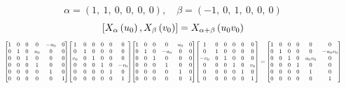 \documentclass[11pt]{article}
\theoremstyle{definition}
\begin{document}
\[
\alpha = \left( 1, \  1, \  0, \  0, \  0, \  0\right), \quad \beta = \left( -1, \  0, \  1, \  0, \  0, \  0\right)
\]
\[
\scaletoalign{\textwidth}{\left[ X_{\alpha}\left(u_{0}\right), X_{\beta}\left(v_{0}\right) \right] = X_{\alpha + \beta}\left(u_{0} v_{0}\right)}
\]
\[
\scaletoalign{\textwidth}{{\left[\begin{matrix}1 & 0 & 0 & 0 & - u_{0} & 0\\0 & 1 & 0 & u_{0} & 0 & 0\\0 & 0 & 1 & 0 & 0 & 0\\0 & 0 & 0 & 1 & 0 & 0\\0 & 0 & 0 & 0 & 1 & 0\\0 & 0 & 0 & 0 & 0 & 1\end{matrix}\right]} {\left[\begin{matrix}1 & 0 & 0 & 0 & 0 & 0\\0 & 1 & 0 & 0 & 0 & 0\\v_{0} & 0 & 1 & 0 & 0 & 0\\0 & 0 & 0 & 1 & 0 & - v_{0}\\0 & 0 & 0 & 0 & 1 & 0\\0 & 0 & 0 & 0 & 0 & 1\end{matrix}\right]} {\left[\begin{matrix}1 & 0 & 0 & 0 & u_{0} & 0\\0 & 1 & 0 & - u_{0} & 0 & 0\\0 & 0 & 1 & 0 & 0 & 0\\0 & 0 & 0 & 1 & 0 & 0\\0 & 0 & 0 & 0 & 1 & 0\\0 & 0 & 0 & 0 & 0 & 1\end{matrix}\right]} {\left[\begin{matrix}1 & 0 & 0 & 0 & 0 & 0\\0 & 1 & 0 & 0 & 0 & 0\\- v_{0} & 0 & 1 & 0 & 0 & 0\\0 & 0 & 0 & 1 & 0 & v_{0}\\0 & 0 & 0 & 0 & 1 & 0\\0 & 0 & 0 & 0 & 0 & 1\end{matrix}\right]} = {\left[\begin{matrix}1 & 0 & 0 & 0 & 0 & 0\\0 & 1 & 0 & 0 & 0 & - u_{0} v_{0}\\0 & 0 & 1 & 0 & u_{0} v_{0} & 0\\0 & 0 & 0 & 1 & 0 & 0\\0 & 0 & 0 & 0 & 1 & 0\\0 & 0 & 0 & 0 & 0 & 1\end{matrix}\right]}}
\]
\end{document}
